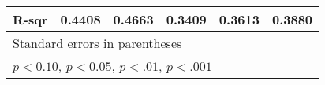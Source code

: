 {\begin{tabular}{l*{5}{c}}
    R-sqr                    & 0.4408                      & 0.4663                      & 0.3409                      & 0.3613                      & 0.3880                      \\
    \bottomrule
    \multicolumn{6}{l}{\footnotesize Standard errors in parentheses}                                                                                                               \\
    \multicolumn{6}{l}{\footnotesize \sym{+} \(p<0.10\), \sym{++} \(p<0.05\), \sym{*} \(p<.01\), \sym{**} \(p<.001\)}                                                              \\
\end{tabular}
}
